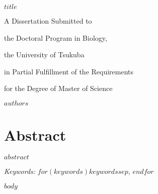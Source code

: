 \documentclass[12pt, a4paper]{report} %
\begin{document}
\def\spacingset#1{\renewcommand{\baselinestretch}%
{#1}\small\normalsize} \spacingset{1}

    \thispagestyle{empty}
    \vspace*{30mm}
    \begin{center}
    \LARGE{\bf $title$}
    \end{center}

    \vspace{6cm}
    \centerline{A Dissertation Submitted to}\par
    \centerline{the Doctoral Program in Biology,}\par
    \centerline{the University of Tsukuba}\par
    \centerline{in Partial Fulfillment of the Requirements}\par
    \centerline{for the Degree of Master of Science}\par

    \vspace{2cm}
    \centerline{\Large{\bf $authors$}}
    \clearpage


\newpage

\chapter*{Abstract}
$abstract$

\noindent%
{\it Keywords:} $for(keywords)$$keywords$$sep$, $endfor$
\vfill

\newpage
\spacingset{1.45} %

$body$



\end{document}
